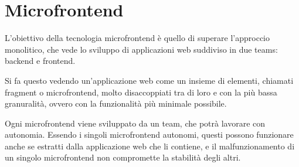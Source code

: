 \chapter{Microfrontend}\label{ch:chapter1}
L'obiettivo della tecnologia microfrontend è quello di superare l'approccio monolitico, che vede
lo sviluppo di applicazioni web suddiviso in due teams: backend e frontend.

Si fa questo vedendo un'applicazione web come un insieme
di elementi, chiamati fragment o microfrontend, molto disaccoppiati tra di loro
e con la più bassa granuralità, ovvero con la funzionalità più minimale possibile.

Ogni microfrontend viene sviluppato da un team, che potrà lavorare con autonomia. Essendo i singoli microfrontend autonomi,
questi possono funzionare anche se estratti dalla applicazione web che li contiene, e il malfunzionamento di un singolo microfrontend
non compromette la stabilità degli altri.



